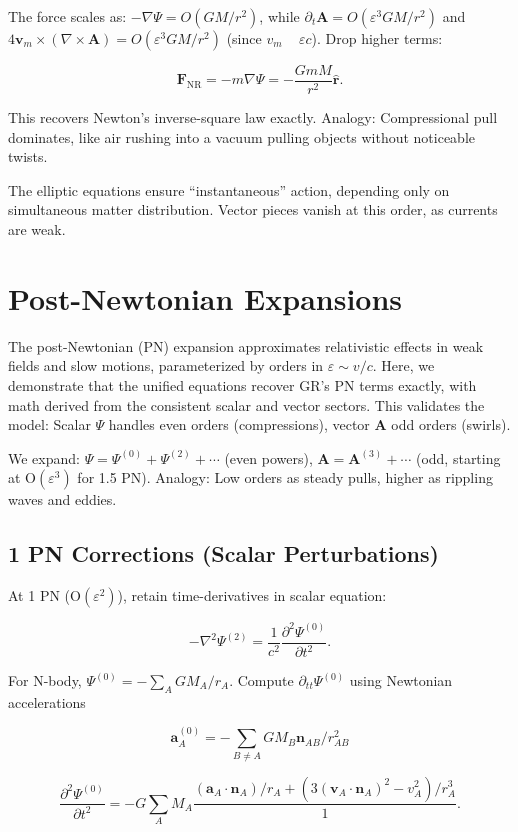 \documentclass{article}
\begin{document}
The force scales as: $-\nabla \Psi = O(GM/r^2)$, while $\partial_t \mathbf{A} = O(\varepsilon^3 GM/r^2)$ and $4 \mathbf{v}_m \times (\nabla \times \mathbf{A}) = O(\varepsilon^3 GM/r^2)$ (since $v_m$ ~ $\varepsilon c$). Drop higher terms:

\[
\mathbf{F}_{\text{NR}} = -m \nabla \Psi = - \frac{G m M}{r^2} \hat{\mathbf{r}}.
\]

This recovers Newton's inverse-square law exactly. Analogy: Compressional pull dominates, like air rushing into a vacuum pulling objects without noticeable twists.

The elliptic equations ensure ``instantaneous'' action, depending only on simultaneous matter distribution. Vector pieces vanish at this order, as currents are weak.

\section{Post-Newtonian Expansions}

The post-Newtonian (PN) expansion approximates relativistic effects in weak fields and slow motions, parameterized by orders in $\varepsilon \sim v/c$. Here, we demonstrate that the unified equations recover GR's PN terms exactly, with math derived from the consistent scalar and vector sectors. This validates the model: Scalar $\Psi$ handles even orders (compressions), vector $\mathbf{A}$ odd orders (swirls).

We expand: $\Psi = \Psi^{(0)} + \Psi^{(2)} + \cdots$ (even powers), $\mathbf{A} = \mathbf{A}^{(3)} + \cdots$ (odd, starting at O$(\varepsilon^3)$ for 1.5 PN). Analogy: Low orders as steady pulls, higher as rippling waves and eddies.

\subsection{1 PN Corrections (Scalar Perturbations)}

At 1 PN (O$(\varepsilon^2)$), retain time-derivatives in scalar equation:

\[
- \nabla^2 \Psi^{(2)} = \frac{1}{c^2} \frac{\partial^2 \Psi^{(0)}}{\partial t^2}.
\]

For N-body, $\Psi^{(0)} = - \sum_A GM_A / r_A$. Compute $\partial_{tt} \Psi^{(0)}$ using Newtonian accelerations

\[
\mathbf{a}_A^{(0)} = - \sum_{B \neq A} GM_B \mathbf{n}_{AB} / r_{AB}^2
\]

\[
\frac{\partial^2 \Psi^{(0)}}{\partial t^2} = - G \sum_A M_A \frac{(\mathbf{a}_A \cdot \mathbf{n}_A) / r_A + (3 (\mathbf{v}_A \cdot \mathbf{n}_A)^2 - v_A^2) / r_A^3 }{1}.
\]
\end{document}
